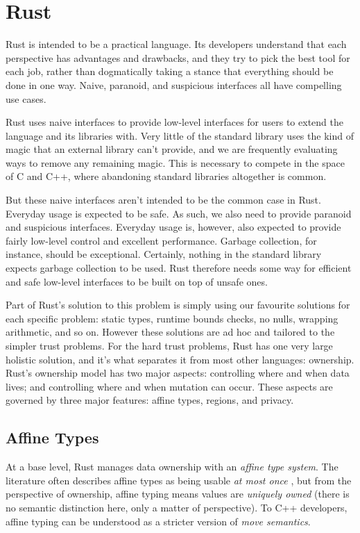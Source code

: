 \chapter{Rust}
\label{ch:rust}

Rust is intended to be a practical language. Its developers understand that each perspective has
advantages and drawbacks, and they try to pick the best tool for each job, rather than
dogmatically taking a stance that everything should be done in one way. Naive, paranoid,
and suspicious interfaces all have compelling use cases.

Rust uses naive interfaces to provide low-level interfaces for users to extend
the language and its libraries with. Very little of the standard library uses
the kind of magic that an external library can't provide, and we are frequently
evaluating ways to remove any remaining magic. This is necessary to compete in
the space of C and C++, where abandoning standard libraries altogether is
common.

But these naive interfaces aren't intended to be the common case in Rust. Everyday
usage is expected to be safe. As such, we also need to provide paranoid and
suspicious interfaces. Everyday usage is, however, also expected to provide fairly
low-level control and excellent performance. Garbage collection, for instance,
should be exceptional. Certainly, nothing in the standard library expects
garbage collection to be used. Rust therefore needs some way for efficient and
safe low-level interfaces to be built on top of unsafe ones.

Part of Rust's solution to this problem is simply using our favourite solutions for
each specific problem: static types, runtime bounds checks, no nulls, wrapping
arithmetic, and so on. However these solutions are ad hoc and tailored to the simpler
trust problems. For the hard trust problems, Rust has one very large holistic solution,
and it's what separates it from most other languages: ownership.
Rust's ownership model has two major aspects: controlling where and when data lives;
and controlling where and when mutation can occur. These aspects are governed by
three major features: affine types, regions, and privacy.






\section{Affine Types}

At a base level, Rust manages data ownership with an \emph{affine type system}. The
literature often describes affine types as being usable \emph{at most once}
\cite{pierce2005advanced}, but from
the perspective of ownership, affine typing means values are \emph{uniquely owned}
(there is no semantic distinction here, only a matter of perspective).
To C++ developers, affine typing can be understood as a stricter version of
\emph{move semantics}.


